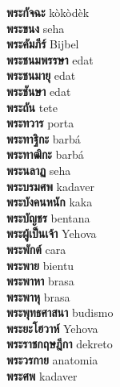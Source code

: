 \textbf{ พระกัจฉะ  } kòkòdèk \\
\textbf{ พระขนง  } seha \\
\textbf{ พระคัมภีร์  } Bijbel \\
\textbf{ พระชนมพรรษา  } edat \\
\textbf{ พระชนมายุ  } edat \\
\textbf{ พระชันษา  } edat \\
\textbf{ พระถัน  } tete \\
\textbf{ พระทวาร  } porta \\
\textbf{ พระทาฐิกะ  } barbá \\
\textbf{ พระทาฒิกะ  } barbá \\
\textbf{ พระนลาฏ  } seha \\
\textbf{ พระบรมศพ  } kadaver \\
\textbf{ พระบังคนหนัก  } kaka \\
\textbf{ พระบัญชร  } bentana \\
\textbf{ พระผู้เป็นเจ้า  } Yehova \\
\textbf{ พระพักต์  } cara \\
\textbf{ พระพาย  } bientu \\
\textbf{ พระพาหา  } brasa \\
\textbf{ พระพาหุ  } brasa \\
\textbf{ พระพุทธศาสนา  } budismo \\
\textbf{ พระยะโฮวาห์  } Yehova \\
\textbf{ พระราชกฤษฎีกา  } dekreto \\
\textbf{ พระวรกาย  } anatomia \\
\textbf{ พระศพ  } kadaver \\
